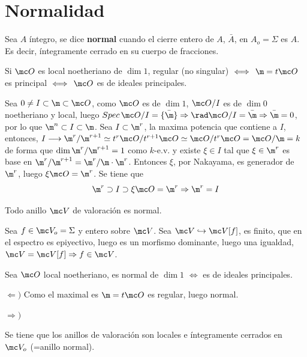 \section{Normalidad}
\begin{defi}
    Sea $A$ \'integro, se dice \textbf{normal} cuando el cierre entero de $A$, $\bar A$, en $A_o = \Sigma$ es $A$. Es decir, \'integramente cerrado en su cuerpo de fracciones.
\end{defi}
\begin{prop}
    Si $\mc O$ es local noetheriano de $\dim 1$, regular (no singular) $\iff \, \m = t\mc O$ es principal $\iff \, \mc O$ es de ideales principales.
\end{prop}
\begin{dem}
    Sea $0 \neq I \subset \m \subset \mc O$, como $\mc O$ es de $\dim 1$, $\mc O / I$ es de $\dim 0$ noetheriano y local, luego $Spec \, \mc O / I = \{\bar \m\} \Rightarrow \rad \mc O / I =\bar \m \Rightarrow \bar \m =0$, por lo que $\m^n \subset I \subset \m$. Sea $I\subset \m^r$, la maxima potencia que contiene a $I$, entonces, $I \longrightarrow \m^r / \m^{r+1} \simeq t^r \mc O / t^{r+1} \mc O \simeq \mc O / t^r \mc O = \mc O / \m = k$ de forma que $\dim \m^r / \m^{r+1} = 1$ como $k$-e.v. y existe $\xi \in I$ tal que $\xi \in \m^r$ es base en $\m^r / \m^{r+1} = \m^r / \m\cdot \m^r$. Entonces $\xi$, por Nakayama, es generador de $\m^r$, luego $\xi \mc O = \m^r$. Se tiene que 
    $$\m^r \supset I \supset \xi \mc O = \m^r \Rightarrow \m^r = I$$
\end{dem}
\begin{lem}
    Todo anillo $\mc V$ de valoraci\'on es normal.
\end{lem}
\begin{dem}
    Sea $f\in \mc V_o = \Sigma$ y entero sobre $\mc V$. Sea $\mc V \hookrightarrow \mc V[f]$, es finito, que en el espectro es epiyectivo, luego es un morfismo dominante, luego una igualdad, $\mc V = \mc V[f] \Rightarrow f\in \mc V$. 
\end{dem}
\begin{prop}
    Sea $\mc O$ local noetheriano, es normal de $\dim 1$ $\iff$ es de ideales principales.
\end{prop}
\begin{dem}
    $\Leftarrow)$ Como el maximal es $\m = t \mc O$ es regular, luego normal.

    $\Rightarrow)$ 
\end{dem}
\begin{obs}
    Se tiene que los anillos de valoraci\'on son locales e \'integramente cerrados en $\mc V_o$ (=anillo normal). 
\end{obs}

